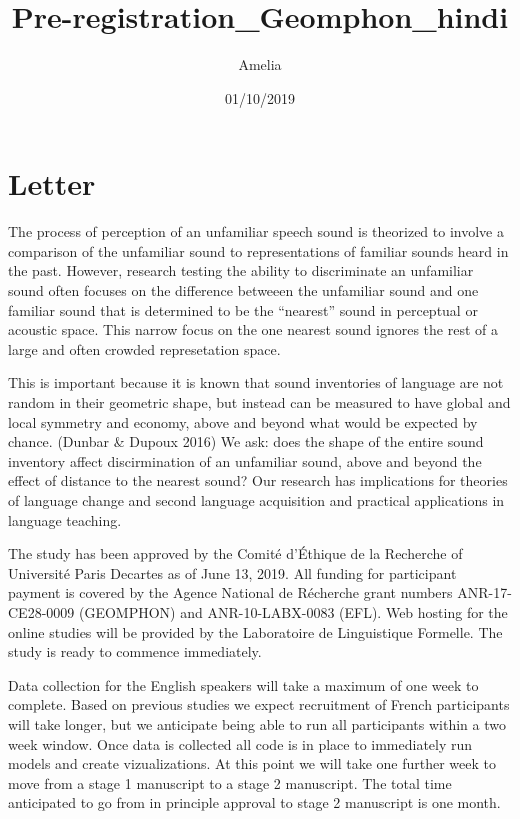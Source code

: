 \documentclass[]{article}
\title{Pre-registration\_Geomphon\_hindi}
\author{Amelia}
\date{01/10/2019}
\begin{document}
\maketitle

\hypertarget{letter}{%
\section{Letter}\label{letter}}

The process of perception of an unfamiliar speech sound is theorized to
involve a comparison of the unfamiliar sound to representations of
familiar sounds heard in the past. However, research testing the ability
to discriminate an unfamiliar sound often focuses on the difference
betweeen the unfamiliar sound and one familiar sound that is determined
to be the ``nearest'' sound in perceptual or acoustic space. This narrow
focus on the one nearest sound ignores the rest of a large and often
crowded represetation space.

This is important because it is known that sound inventories of language
are not random in their geometric shape, but instead can be measured to
have global and local symmetry and economy, above and beyond what would
be expected by chance. (Dunbar \& Dupoux 2016) We ask: does the shape of
the entire sound inventory affect discirmination of an unfamiliar sound,
above and beyond the effect of distance to the nearest sound? Our
research has implications for theories of language change and second
language acquisition and practical applications in language teaching.

The study has been approved by the Comité d'Éthique de la Recherche of
Université Paris Decartes as of June 13, 2019. All funding for
participant payment is covered by the Agence National de Récherche grant
numbers ANR-17-CE28-0009 (GEOMPHON) and ANR-10-LABX-0083 (EFL). Web
hosting for the online studies will be provided by the Laboratoire de
Linguistique Formelle. The study is ready to commence immediately.

Data collection for the English speakers will take a maximum of one week
to complete. Based on previous studies we expect recruitment of French
participants will take longer, but we anticipate being able to run all
participants within a two week window. Once data is collected all code
is in place to immediately run models and create vizualizations. At this
point we will take one further week to move from a stage 1 manuscript to
a stage 2 manuscript. The total time anticipated to go from in principle
approval to stage 2 manuscript is one month.
\end{document}
